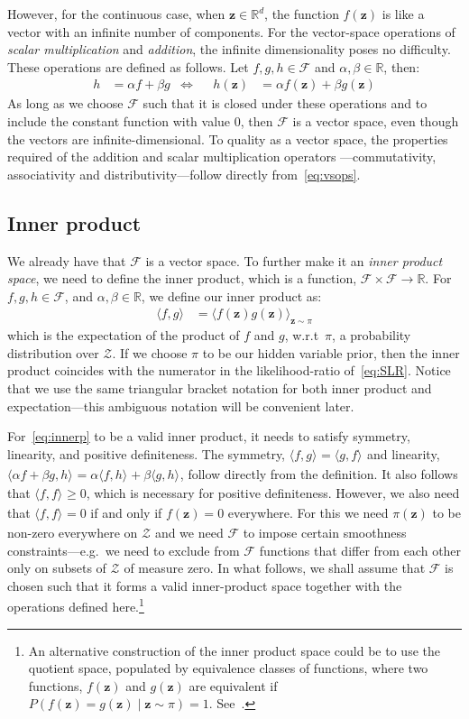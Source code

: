 \documentclass[a4paper,oneside,12pt,english]{report}
\def\zvec{\mathbf{z}}
\def\expv#1#2{\bigl\langle#1\bigr\rangle_{#2}}
\def\R{\mathbb{R}}
\def\Zset{\mathcal{Z}}
\def\Zset{\mathcal{Z}}
\def\Fset{\mathcal{F}}
\def\dot#1#2{\expv{#1,#2}{}}
\begin{document}
However, for the continuous case, when $\zvec\in\R^d$, the function $f(\zvec)$ is like a vector with an infinite number of components. For the vector-space operations of \emph{scalar multiplication} and \emph{addition}, the infinite dimensionality poses no difficulty. These operations are defined as follows. Let $f,g,h\in\Fset$ and $\alpha,\beta\in\R$, then:
\begin{align}
\label{eq:vsops}
h &= \alpha f + \beta g & \Leftrightarrow && h(\zvec) &= \alpha f(\zvec) + \beta g(\zvec)
\end{align} 
As long as we choose $\Fset$ such that it is closed under these operations and to include the constant function with value $0$, then $\Fset$ is a vector space, even though the vectors are infinite-dimensional. To quality as a vector space, the properties required of the addition and scalar multiplication operators ---commutativity, associativity and distributivity---follow directly from~\eqref{eq:vsops}.

\subsection{Inner product}
We already have that $\Fset$ is a vector space. To further make it an \emph{inner product space}, we need to define the inner product, which is a function, $\Fset\times\Fset\to\R$. For $f,g,h\in\Fset$, and $\alpha,\beta\in\R$, we define our inner product as:
\begin{align}
\label{eq:innerp}
\dot{f}{g} &= \expv{f(\zvec)g(\zvec)}{\zvec\sim\pi}
\end{align}
which is the expectation of the product of $f$ and $g$, w.r.t\ $\pi$, a probability distribution over $\Zset$. If we choose $\pi$ to be our hidden variable prior, then the inner product coincides with the numerator in the likelihood-ratio of~\eqref{eq:SLR}. Notice that we use the same triangular bracket notation for both inner product and expectation---this ambiguous notation will be convenient later. 

For~\eqref{eq:innerp} to be a valid inner product, it needs to satisfy symmetry, linearity, and positive definiteness. The symmetry, $\dot{f}{g}=\dot{g}{f}$ and linearity, $\dot{\alpha f+\beta g}{h}=\alpha\dot{f}{h}+\beta\dot{g}{h}$, follow directly from the definition. It also follows that $\dot{f}{f}\ge0$, which is necessary for positive definiteness. However, we also need that $\dot{f}{f}=0$ if and only if $f(\zvec)=0$ everywhere. For this we need $\pi(\zvec)$ to be non-zero everywhere on $\Zset$ and we need $\Fset$ to impose certain smoothness constraints---e.g.\ we need to exclude from $\Fset$ functions that differ from each other only on subsets of $\Zset$ of measure zero. In what follows, we shall assume that $\Fset$ is chosen such that it forms a valid inner-product space together with the operations defined here.\footnote{An alternative construction of the inner product space could be to use the quotient space, populated by equivalence classes of functions, where two functions, $f(\zvec)$ and $g(\zvec)$ are equivalent if $P(f(\zvec)=g(\zvec)\mid \zvec\sim\pi)=1$. See~\cite{random}.}
\end{document}
